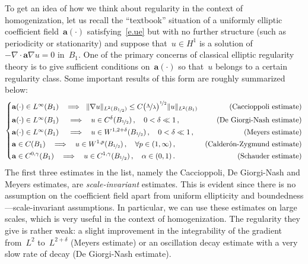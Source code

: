 \documentclass[11pt,twoside]{article} %
\numberwithin{equation}{section}
\theoremstyle{definition}
\let\originalleft\left
\let\originalright\right
\renewcommand{\left}{\mathopen{}\mathclose\bgroup\originalleft}
\renewcommand{\right}{\aftergroup\egroup\originalright}
\renewcommand{\a}{\mathbf{a}}
\begin{document}
To get an idea of how we think about regularity in the context of homogenization, let us recall the ``textbook'' situation of a uniformly elliptic coefficient field~$\a(\cdot)$ satisfying~\eqref{e.ue} but with no further structure (such as periodicity or stationarity) and suppose that~$u\in H^1$ is a solution of~$-\nabla \cdot \a\nabla u = 0$ in~$B_1$. One of the primary concerns of classical elliptic regularity theory is to give sufficient conditions on~$\a(\cdot)$ so that~$u$ belongs to a certain regularity class. Some important results of this form are roughly summarized below:
\begin{equation}
\label{e.classical.regularity}
\left\{
\begin{aligned}
&
\mbox{$\a(\cdot)\in L^\infty(B_1)~$}  \ \implies \ \|\nabla u\|_{L^2(B_{\nicefrac12})} \leq C \bigl( \nicefrac{\Lambda}{\lambda} \bigr)^{\nicefrac12}\| u\|_{L^2(B_{1})} 
& \mbox{(Caccioppoli estimate)}
\\
& 
\mbox{$\a(\cdot)\in L^\infty(B_1)~$} 
\ \ \implies \ \
u \in C^{\delta}(B_{\nicefrac12}) 
\,, \quad 0< \delta \ll 1\,, 
& \mbox{(De Giorgi-Nash estimate)}
\\ & 
\mbox{$\a(\cdot)\in L^\infty(B_1)~$} 
\ \ \implies \ \
u \in W^{1,2+\delta} (B_{\nicefrac12}) 
\,, \quad 0<\delta \ll 1\,, 
& \mbox{(Meyers estimate)}
\\ & 
\a \in C(B_1) 
\ \ \implies \ \
u \in W^{1,p} (B_{\nicefrac12}) 
\,, \quad \forall p\in (1,\infty) \,, 
& \mbox{(Calder\'on-Zygmund estimate)}
\\ & 
\a \in C^{0,\gamma} (B_1)  
\ \ \implies \ \
u \in C^{1,\gamma} (B_{\nicefrac12}) 
\,, \quad \alpha\in (0,1) \,.
& \mbox{(Schauder estimate)}
\end{aligned}
\right.
\end{equation}
The first three estimates in the list, namely the Caccioppoli, De Giorgi-Nash and Meyers estimates, are 
\emph{scale-invariant} estimates. This is evident since there is no assumption on the coefficient field apart from uniform ellipticity and boundedness---scale-invariant assumptions. In particular, we can use these estimates on large scales, which is very useful in the context of homogenization. 
The regularity they give is rather weak: a slight improvement in the integrability of the gradient from~$L^2$ to~$L^{2+\delta}$ (Meyers estimate) or an oscillation decay estimate with a very slow rate of decay (De Giorgi-Nash estimate). 

\smallskip
\end{document}
